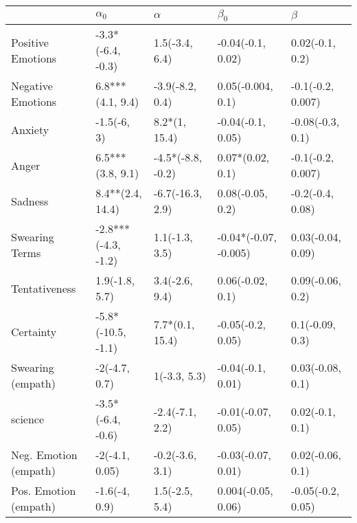 \begin{tabular}{lllll}
\toprule
{} &           $\alpha_0$ &           $\alpha$ &              $\beta_0$ &            $\beta$ \\
\midrule
Positive Emotions     &    -3.3*(-6.4, -0.3) &     1.5(-3.4, 6.4) &      -0.04(-0.1, 0.02) &    0.02(-0.1, 0.2) \\
Negative Emotions     &     6.8***(4.1, 9.4) &    -3.9(-8.2, 0.4) &      0.05(-0.004, 0.1) &  -0.1(-0.2, 0.007) \\
Anxiety               &          -1.5(-6, 3) &      8.2*(1, 15.4) &      -0.04(-0.1, 0.05) &   -0.08(-0.3, 0.1) \\
Anger                 &     6.5***(3.8, 9.1) &  -4.5*(-8.8, -0.2) &       0.07*(0.02, 0.1) &  -0.1(-0.2, 0.007) \\
Sadness               &     8.4**(2.4, 14.4) &   -6.7(-16.3, 2.9) &       0.08(-0.05, 0.2) &   -0.2(-0.4, 0.08) \\
Swearing Terms        &  -2.8***(-4.3, -1.2) &     1.1(-1.3, 3.5) &  -0.04*(-0.07, -0.005) &  0.03(-0.04, 0.09) \\
Tentativeness         &       1.9(-1.8, 5.7) &     3.4(-2.6, 9.4) &       0.06(-0.02, 0.1) &   0.09(-0.06, 0.2) \\
Certainty             &   -5.8*(-10.5, -1.1) &    7.7*(0.1, 15.4) &      -0.05(-0.2, 0.05) &    0.1(-0.09, 0.3) \\
Swearing (empath)     &        -2(-4.7, 0.7) &       1(-3.3, 5.3) &      -0.04(-0.1, 0.01) &   0.03(-0.08, 0.1) \\
science               &    -3.5*(-6.4, -0.6) &    -2.4(-7.1, 2.2) &     -0.01(-0.07, 0.05) &    0.02(-0.1, 0.1) \\
Neg. Emotion (empath) &       -2(-4.1, 0.05) &    -0.2(-3.6, 3.1) &     -0.03(-0.07, 0.01) &   0.02(-0.06, 0.1) \\
Pos. Emotion (empath) &        -1.6(-4, 0.9) &     1.5(-2.5, 5.4) &     0.004(-0.05, 0.06) &  -0.05(-0.2, 0.05) \\
\bottomrule
\end{tabular}
